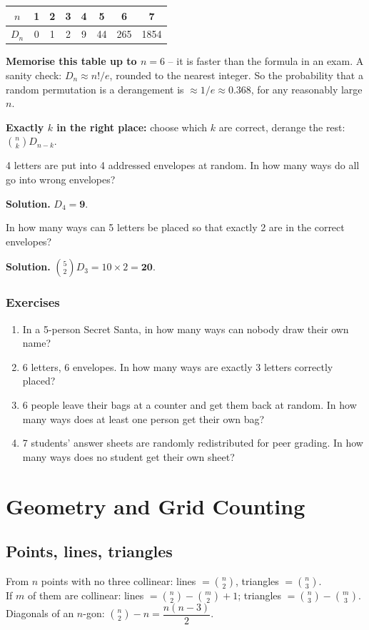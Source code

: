 \documentclass[11pt,a4paper,openany]{report}
\newenvironment{exercises}{\subsection*{Exercises \thechapter}\begin{enumerate}[label=\textbf{\thechapter.\arabic*},leftmargin=3.2em]}{\end{enumerate}}
\newcommand{\C}[2]{\binom{#1}{#2}}
\begin{document}
\begin{center}
\begin{tabular}{c|ccccccc}
$n$ & 1&2&3&4&5&6&7\\\hline
$D_n$ & 0&1&2&9&44&265&1854
\end{tabular}
\end{center}
\textbf{Memorise this table up to $n=6$} -- it is faster than the formula in an exam.
A sanity check: $D_n\approx n!/e$, rounded to the nearest integer. So the probability that a random
permutation is a derangement is $\approx 1/e\approx 0.368$, for any reasonably large $n$.

\textbf{Exactly $k$ in the right place:} choose which $k$ are correct, derange the rest:
$\C nk D_{n-k}$.

\begin{example}
4 letters are put into 4 addressed envelopes at random. In how many ways do all go into wrong envelopes?

\textbf{Solution.} $D_4=\mathbf{9}$.
\end{example}

\begin{example}
In how many ways can 5 letters be placed so that exactly 2 are in the correct envelopes?

\textbf{Solution.} $\C52D_3=10\times2=\mathbf{20}$.
\end{example}

\begin{exercises}
\item In a 5-person Secret Santa, in how many ways can nobody draw their own name?
\item 6 letters, 6 envelopes. In how many ways are exactly 3 letters correctly placed?
\item 6 people leave their bags at a counter and get them back at random. In how many ways does at least one person get their own bag?
\item 7 students' answer sheets are randomly redistributed for peer grading. In how many ways does no student get their own sheet?
\end{exercises}

\chapter{Geometry and Grid Counting}\label{ch:grid}

\section{Points, lines, triangles}
From $n$ points with no three collinear: lines $=\C n2$, triangles $=\C n3$.\\
If $m$ of them are collinear: lines $=\C n2-\C m2+1$; triangles $=\C n3-\C m3$.\\
Diagonals of an $n$-gon: $\C n2-n=\dfrac{n(n-3)}2$.
\end{document}
